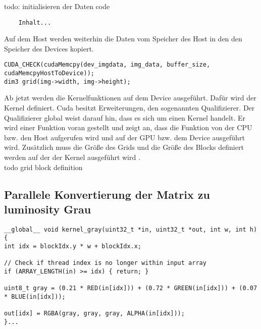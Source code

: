 \documentclass{llncs}
\begin{document}
todo: initialisieren der Daten code\\

\begin{lstlisting}
	Inhalt...
\end{lstlisting}

Auf dem Host werden weiterhin die Daten vom Speicher des Host in den den Speicher des Devices kopiert.\\ 

\begin{lstlisting}[]
CUDA_CHECK(cudaMemcpy(dev_imgdata, img_data, buffer_size, cudaMemcpyHostToDevice));
dim3 grid(img->width, img->height);
\end{lstlisting}

Ab jetzt werden die Kernelfunktionen auf dem Device ausgeführt. Dafür wird der Kernel definiert. Cuda besitzt Erweiterungen, den sogenannten Qualifizierer. Der Qualifizierer \textunderscore\textunderscore global \textunderscore\textunderscore weist darauf hin, dass es sich um einen Kernel handelt. Er wird einer Funktion voran gestellt und zeigt an, dass die Funktion von der CPU bzw. den Host aufgerufen wird und auf der GPU bzw. dem Device ausgeführt wird. Zusätzlich muss die Größe des Grids und die Größe des Blocks definiert werden auf der der Kernel ausgeführt wird \cite{NVIDIACorporation.2017}.\\
todo grid block definition

%
\subsection{Parallele Konvertierung der Matrix zu luminosity Grau}
%
\begin{lstlisting}
__global__ void kernel_gray(uint32_t *in, uint32_t *out, int w, int h){
int idx = blockIdx.y * w + blockIdx.x;
	
// Check if thread index is no longer within input array
if (ARRAY_LENGTH(in) >= idx) { return; }
	
uint8_t gray = (0.21 * RED(in[idx])) + (0.72 * GREEN(in[idx])) + (0.07 * BLUE(in[idx]));
	
out[idx] = RGBA(gray, gray, gray, ALPHA(in[idx]));
}...
\end{lstlisting}
%
\end{document}
